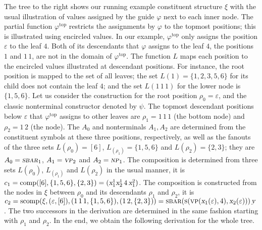 \documentclass[../../document.tex]{subfiles}
\begin{document}
    \begin{wrapfigure}[8]{r}{0pt}
        
    \end{wrapfigure}
    \parexample\label{ex:extraction:head}
    The tree to the right shows our running example constituent structure \(\xi\) with the usual illustration of values assigned by the guide \(\varphi\) next to each inner node.
    The partial function \(\varphi^{\text{top}}\) restricts the assignments by \(\varphi\) to the topmost positions; this is illustrated using encircled values.
    In our example, \(\varphi^{\text{top}}\) only assigns the position \(\varepsilon\) to the leaf \(4\).
    Both of its descendants that \(\varphi\) assigns to the leaf \(4\), the positions \(1\) and \(1\,1\), are not in the domain of \(\varphi^{\text{top}}\).
    The function \(L\) maps each position to the encircled values illustrated at descendant positions.
    For instance, the root position is mapped to the set of all leaves; the set \(L(1) = \{1,2,3,5,6\}\) for its child does not contain the leaf $4$; and the set \(L(1\,1\,1)\) for the lower  node is \(\{1,5,6\}\).
    Let us consider the construction for the root position \(\rho_0 = \varepsilon\), and the classic nonterminal constructor denoted by \(\psi\).
    The topmost descendant positions below \(\varepsilon\) that \(\varphi^{\text{top}}\) assigns to other leaves are \(\rho_1 = 1\,1\,1\) (the bottom  node) and \(\rho_2 = 1\,2\) (the  node).
    The  \(A_0\) and  nonterminals \(A_1, A_2\) are determined from the constituent symbols at these three positions, respectively, as well as the fanouts of the three sets \(L(\rho_0) = [6]\), \(L_(\rho_1) = \{1,5,6\}\) and \(L(\rho_2) = \{2,3\}\); they are \(A_0 = \textsc{\textsl{sbar}}_1\), \(A_1 = \textsc{\textsl{vp}}_2\) and \(A_2 = \textsc{\textsl{np}}_1\).
    The  composition is determined from three sets \(L(\rho_0)\), \(L_(\rho_1)\) and \(L(\rho_2)\) in the usual manner, it is \(c_1 = \mathrm{comp}([6], \{1,5,6\}, \{2,3\}) = (\textsl{x}_1^1\textsl{x}_2^1\,4\,\textsl{x}_1^2)\).
    The  composition is constructed from the nodes in \(\xi\) between \(\rho_0\) and its descendants \(\rho_1\) and \(\rho_2\), it is \(c_2 = \mathrm{scomp}(\xi, (\varepsilon, [6]), (1\,1\,1, \{1,5,6\}), (1\,2, \{2,3\})) = \textsc{sbar}(\textsc{s}(\textsc{vp}(\textsl{x}_1(\varepsilon), 4), \textsl{x}_2(\varepsilon)))\,\textsl{y}\).
    The two successors in the derivation are determined in the same fashion starting with \(\rho_1\) and \(\rho_2\).
    In the end, we obtain the following derivation for the whole tree.
    \begin{center}
        
    \end{center}
    \exampleqed
\end{document}
